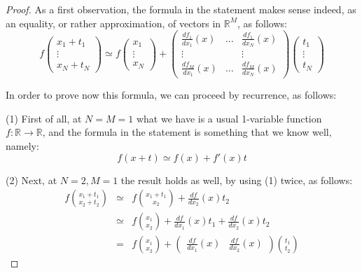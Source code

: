 \documentclass[12pt]{amsbook}
\begin{document}
\begin{proof}
As a first observation, the formula in the statement makes sense indeed, as an equality, or rather approximation, of vectors in $\mathbb R^M$, as follows:
$$f\begin{pmatrix}x_1+t_1\\ \vdots\\ x_N+t_N\end{pmatrix}
\simeq f\begin{pmatrix}x_1\\ \vdots\\ x_N\end{pmatrix}
+\begin{pmatrix}
\frac{df_1}{dx_1}(x)&\ldots&\frac{df_1}{dx_N}(x)\\
\vdots&&\vdots\\
\frac{df_M}{dx_1}(x)&\ldots&\frac{df_M}{dx_N}(x)
\end{pmatrix}\begin{pmatrix}t_1\\ \vdots\\ t_N\end{pmatrix}$$

In order to prove now this formula, we can proceed by recurrence, as follows:

\medskip

(1) First of all, at $N=M=1$ what we have is a usual 1-variable function $f:\mathbb R\to\mathbb R$, and the formula in the statement is something that we know well, namely:
$$f(x+t)\simeq f(x)+f'(x)t$$

(2) Next, at $N=2,M=1$ the result holds as well, by using (1) twice, as follows:
\begin{eqnarray*}
f\binom{x_1+t_1}{x_2+t_2}
&\simeq&f\binom{x_1+t_1}{x_2}+\frac{df}{dx_2}(x)t_2\\
&\simeq&f\binom{x_1}{x_2}+\frac{df}{dx_1}(x)t_1+\frac{df}{dx_2}(x)t_2\\
&=&f\binom{x_1}{x_2}+\begin{pmatrix}\frac{df}{dx_1}(x)&\frac{df}{dx_2}(x)\end{pmatrix}\binom{t_1}{t_2}
\end{eqnarray*}


\end{proof}
\end{document}
